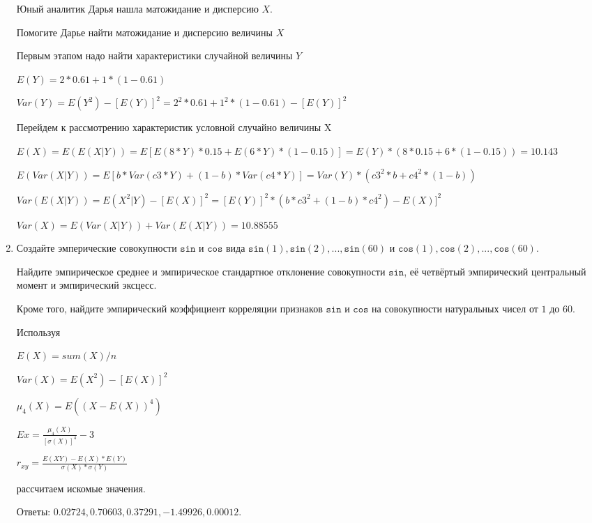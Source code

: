\documentclass[a4paper,12pt]{article}
\begin{document}
\begin{enumerate}
	Юный аналитик Дарья нашла матожидание и дисперсию $X$.

	Помогите Дарье найти матожидание и дисперсию величины $X$
	


	

	Первым этапом надо найти характеристики случайной величины $Y$

	$E(Y) = 2 * 0.61 + 1 * (1 - 0.61)$

	$Var(Y) = E(Y^2) - [E(Y)]^2 = 2^2 * 0.61 + 1^2 * (1 - 0.61) - [E(Y)]^2$


	Перейдем к рассмотрению характеристик условной случайно величины X

	$E(X) = E(E(X|Y)) = E[E(8 * Y) * 0.15 + E(6 * Y) * (1 - 0.15)] = E(Y) * (8 * 0.15 + 6 * (1 - 0.15)) = 10.143$

	$E(Var(X|Y)) = E[b * Var(c3 * Y) + (1 - b) * Var(c4 * Y)] = Var(Y) * (c3^2 * b + c4^2 * (1- b)) $

	$Var(E(X|Y)) = E(X^2|Y) - [E(X)]^2 = [E(Y)]^2 * (b * c3^2 + (1-b)*c4^2) - E(X)]^2$

	$Var(X) = E(Var(X|Y)) + Var(E(X|Y)) = 10.88555$
	

\item

    
    Создайте эмперические совокупности  $\mathtt{\text{sin}}$ и $\mathtt{\text{cos}}$ вида $\mathtt{\text{sin}}(1),\mathtt{\text{sin}}(2), ..., \mathtt{\text{sin}}(60) $ и $\mathtt{\text{cos}}(1),\mathtt{\text{cos}}(2), ..., \mathtt{\text{cos}}(60). $

    Найдите эмпирическое среднее и эмпирическое стандартное отклонение совокупности $\mathtt{\text{sin}}$, её четвёртый эмпирический центральный момент и эмпирический эксцесс.

    Кроме того, найдите эмпирический коэффициент корреляции признаков $\mathtt{\text{sin}}$ и $\mathtt{\text{cos}}$ на совокупности натуральных чисел от $1$ до $60$.
    


    
    Используя

	$E(X) = sum(X) / n$

	$Var(X) = E(X^2) - [E(X)]^2$

	$\mu_4(X) = E((X-E(X))^4)$

	$Ex = \frac{\mu_4(X)}{[\sigma(X)]^4} - 3$

	$r_{xy} = \frac{E(XY) - E(X) * E(Y)}{\sigma(X) * \sigma(Y)}$

    рассчитаем искомые значения.

    Ответы: $0.02724, 0.70603, 0.37291, -1.49926, 0.00012$.


\end{enumerate}
\end{document}
